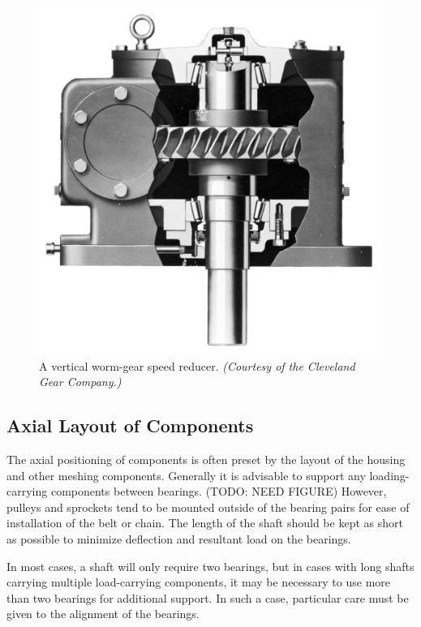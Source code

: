\documentclass[
10pt,
a4paper,
openany,
svgnames,
]{book}
\begin{document}
\begin{figure}[H]
  \centering
  \includegraphics[height=0.3\textheight]{pictures/Shafts/speed-reducer-layout}
  \caption{A vertical worm-gear speed reducer. \emph{(Courtesy of the Cleveland Gear Company.)}}
  \label{fig: worm-gear speed reducer layout}
\end{figure}

\subsection{Axial Layout of Components}

The axial positioning of components is often preset by the layout of the housing and other meshing components. Generally it is advisable to support any loading-carrying components between bearings. (TODO: NEED FIGURE) However, pulleys and sprockets tend to be mounted outside of the bearing pairs for ease of installation of the belt or chain. The length of the shaft should be kept as short as possible to minimize deflection and resultant load on the bearings.

In most cases, a shaft will only require two bearings, but in cases with long shafts carrying multiple load-carrying components, it may be necessary to use more than two bearings for additional support. In such a case, particular care must be given to the alignment of the bearings.
\end{document}
